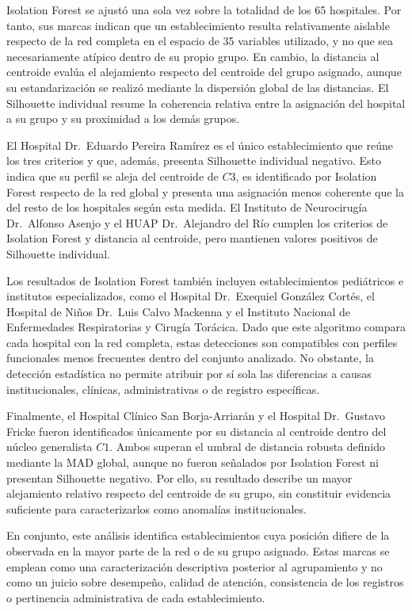 Isolation Forest se ajustó una sola vez sobre la totalidad de los 65 hospitales. Por tanto, sus marcas indican que un establecimiento resulta relativamente aislable respecto de la red completa en el espacio de 35 variables utilizado, y no que sea necesariamente atípico dentro de su propio grupo. En cambio, la distancia al centroide evalúa el alejamiento respecto del centroide del grupo asignado, aunque su estandarización se realizó mediante la dispersión global de las distancias. El Silhouette individual resume la coherencia relativa entre la asignación del hospital a su grupo y su proximidad a los demás grupos.

El Hospital Dr.\ Eduardo Pereira Ramírez es el único establecimiento que reúne los tres criterios y que, además, presenta Silhouette individual negativo. Esto indica que su perfil se aleja del centroide de $C3$, es identificado por Isolation Forest respecto de la red global y presenta una asignación menos coherente que la del resto de los hospitales según esta medida. El Instituto de Neurocirugía Dr.\ Alfonso Asenjo y el HUAP Dr.\ Alejandro del Río cumplen los criterios de Isolation Forest y distancia al centroide, pero mantienen valores positivos de Silhouette individual.

Los resultados de Isolation Forest también incluyen establecimientos pediátricos e institutos especializados, como el Hospital Dr.\ Exequiel González Cortés, el Hospital de Niños Dr.\ Luis Calvo Mackenna y el Instituto Nacional de Enfermedades Respiratorias y Cirugía Torácica. Dado que este algoritmo compara cada hospital con la red completa, estas detecciones son compatibles con perfiles funcionales menos frecuentes dentro del conjunto analizado. No obstante, la detección estadística no permite atribuir por sí sola las diferencias a causas institucionales, clínicas, administrativas o de registro específicas.

Finalmente, el Hospital Clínico San Borja-Arriarán y el Hospital Dr.\ Gustavo Fricke fueron identificados únicamente por su distancia al centroide dentro del núcleo generalista $C1$. Ambos superan el umbral de distancia robusta definido mediante la MAD global, aunque no fueron señalados por Isolation Forest ni presentan Silhouette negativo. Por ello, su resultado describe un mayor alejamiento relativo respecto del centroide de su grupo, sin constituir evidencia suficiente para caracterizarlos como anomalías institucionales.

En conjunto, este análisis identifica establecimientos cuya posición difiere de la observada en la mayor parte de la red o de su grupo asignado. Estas marcas se emplean como una caracterización descriptiva posterior al agrupamiento y no como un juicio sobre desempeño, calidad de atención, consistencia de los registros o pertinencia administrativa de cada establecimiento.

